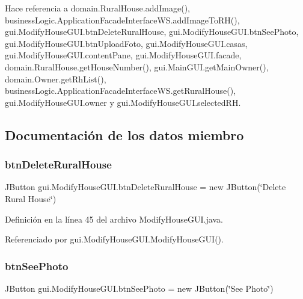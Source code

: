 Hace referencia a domain.\+Rural\+House.\+add\+Image(), business\+Logic.\+Application\+Facade\+Interface\+W\+S.\+add\+Image\+To\+R\+H(), gui.\+Modify\+House\+G\+U\+I.\+btn\+Delete\+Rural\+House, gui.\+Modify\+House\+G\+U\+I.\+btn\+See\+Photo, gui.\+Modify\+House\+G\+U\+I.\+btn\+Upload\+Foto, gui.\+Modify\+House\+G\+U\+I.\+casas, gui.\+Modify\+House\+G\+U\+I.\+content\+Pane, gui.\+Modify\+House\+G\+U\+I.\+facade, domain.\+Rural\+House.\+get\+House\+Number(), gui.\+Main\+G\+U\+I.\+get\+Main\+Owner(), domain.\+Owner.\+get\+Rh\+List(), business\+Logic.\+Application\+Facade\+Interface\+W\+S.\+get\+Rural\+House(), gui.\+Modify\+House\+G\+U\+I.\+owner y gui.\+Modify\+House\+G\+U\+I.\+selected\+RH.



\subsection{Documentación de los datos miembro}
\mbox{\label{classgui_1_1_modify_house_g_u_i_ab035400265dc2c288707e9f30fd7414f}} 
\subsubsection{\texorpdfstring{btnDeleteRuralHouse}{btnDeleteRuralHouse}}
{\footnotesize\ttfamily J\+Button gui.\+Modify\+House\+G\+U\+I.\+btn\+Delete\+Rural\+House = new J\+Button(\char`\"{}Delete Rural House\char`\"{})\hspace{0.3cm}{\ttfamily [private]}}



Definición en la línea 45 del archivo Modify\+House\+G\+U\+I.\+java.



Referenciado por gui.\+Modify\+House\+G\+U\+I.\+Modify\+House\+G\+U\+I().

\mbox{\label{classgui_1_1_modify_house_g_u_i_a25b4d3da9ad668a5a976faf0d2518ce9}} 
\subsubsection{\texorpdfstring{btnSeePhoto}{btnSeePhoto}}
{\footnotesize\ttfamily J\+Button gui.\+Modify\+House\+G\+U\+I.\+btn\+See\+Photo = new J\+Button(\char`\"{}See Photo\char`\"{})\hspace{0.3cm}{\ttfamily [private]}}



